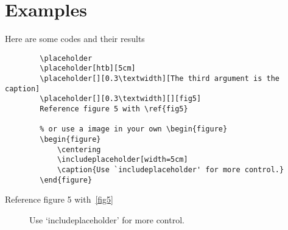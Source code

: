 \documentclass[12pt]{article}
\begin{document}
    \section{Examples}
    Here are some codes and their results
    \begin{lstlisting}
        \placeholder
        \placeholder[htb][5cm]
        \placeholder[][0.3\textwidth][The third argument is the caption]
        \placeholder[][0.3\textwidth][][fig5]
        Reference figure 5 with \ref{fig5} 
        
        % or use a image in your own \begin{figure}
        \begin{figure}
            \centering
            \includeplaceholder[width=5cm]
            \caption{Use `includeplaceholder' for more control.} 
        \end{figure}
    \end{lstlisting}
    \placeholder%
    \placeholder[htb][5cm]
    \placeholder[][0.5\textwidth][][fig5]
    Reference figure 5 with~\ref{fig5} 
    \begin{figure}
        \centering
        \caption{Use `includeplaceholder' for more control.} 
    \end{figure}
\end{document}
